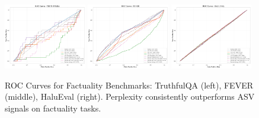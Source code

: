 \documentclass[11pt]{article}
\begin{document}
\begin{figure}[h]
\centering
\includegraphics[width=0.32\textwidth]{figures/truthfulqa_roc_curves.png}
\includegraphics[width=0.32\textwidth]{figures/fever_roc_curves.png}
\includegraphics[width=0.32\textwidth]{figures/halueval_roc_curves.png}
\caption{ROC Curves for Factuality Benchmarks: TruthfulQA (left), FEVER (middle), HaluEval (right). Perplexity consistently outperforms ASV signals on factuality tasks.}
\label{fig:factuality-roc}
\end{figure}
\end{document}
